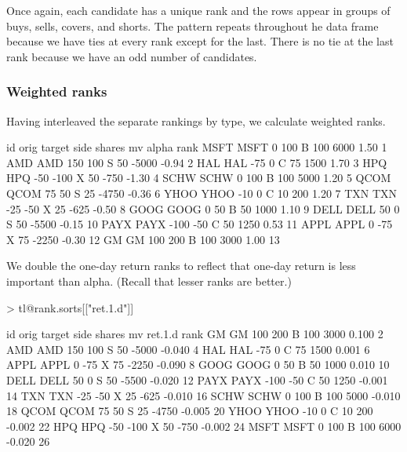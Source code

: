 \documentclass{article}
\begin{document}
Once again, each candidate has a unique rank and the rows appear in
groups of buys, sells, covers, and shorts.  The pattern repeats
throughout he data frame because we have ties at every rank except for
the last.  There is no tie at the last rank because we have an odd
number of candidates.

\subsubsection{Weighted ranks}

Having interleaved the separate rankings by type, we calculate
weighted ranks.

\begin{Schunk}
\begin{Soutput}
       id orig target side shares    mv alpha rank
MSFT MSFT    0    100    B    100  6000  1.50    1
AMD   AMD  150    100    S     50 -5000 -0.94    2
HAL   HAL  -75      0    C     75  1500  1.70    3
HPQ   HPQ  -50   -100    X     50  -750 -1.30    4
SCHW SCHW    0    100    B    100  5000  1.20    5
QCOM QCOM   75     50    S     25 -4750 -0.36    6
YHOO YHOO  -10      0    C     10   200  1.20    7
TXN   TXN  -25    -50    X     25  -625 -0.50    8
GOOG GOOG    0     50    B     50  1000  1.10    9
DELL DELL   50      0    S     50 -5500 -0.15   10
PAYX PAYX -100    -50    C     50  1250  0.53   11
APPL APPL    0    -75    X     75 -2250 -0.30   12
GM     GM  100    200    B    100  3000  1.00   13
\end{Soutput}
\end{Schunk}

We double the one-day return ranks to reflect that one-day return is
less important than alpha.  (Recall that lesser ranks are better.)

\begin{Schunk}
\begin{Sinput}
> tl@rank.sorts[["ret.1.d"]]
\end{Sinput}
\begin{Soutput}
       id orig target side shares    mv ret.1.d rank
GM     GM  100    200    B    100  3000   0.100    2
AMD   AMD  150    100    S     50 -5000  -0.040    4
HAL   HAL  -75      0    C     75  1500   0.001    6
APPL APPL    0    -75    X     75 -2250  -0.090    8
GOOG GOOG    0     50    B     50  1000   0.010   10
DELL DELL   50      0    S     50 -5500  -0.020   12
PAYX PAYX -100    -50    C     50  1250  -0.001   14
TXN   TXN  -25    -50    X     25  -625  -0.010   16
SCHW SCHW    0    100    B    100  5000  -0.010   18
QCOM QCOM   75     50    S     25 -4750  -0.005   20
YHOO YHOO  -10      0    C     10   200  -0.002   22
HPQ   HPQ  -50   -100    X     50  -750  -0.002   24
MSFT MSFT    0    100    B    100  6000  -0.020   26
\end{Soutput}
\end{Schunk}
\end{document}
